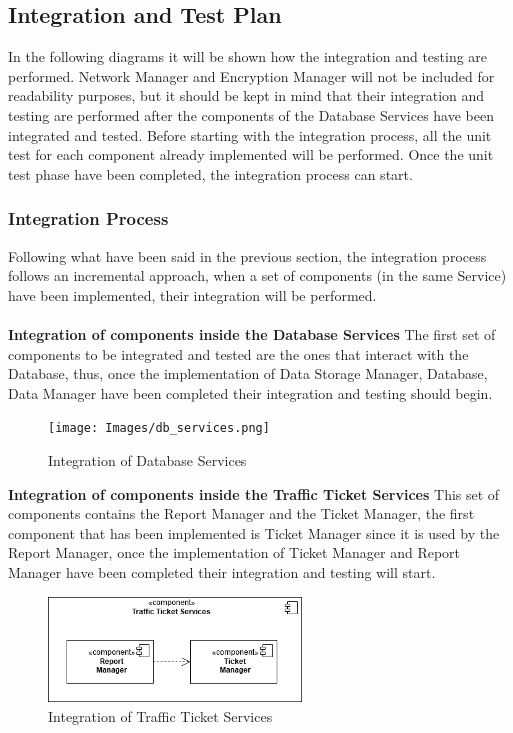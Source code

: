 \subsection{Integration and Test Plan}
In the following diagrams it will be shown how the integration and testing are performed. Network Manager and Encryption Manager will not be included for readability purposes, but it should be kept in mind that their integration and testing are performed after the components of the Database Services have been integrated and tested. Before starting with the integration process, all the unit test for each component already implemented will be performed. Once the unit test phase have been completed, the integration process can start.
\subsubsection{Integration Process}
Following what have been said in the previous section, the integration process follows an incremental approach, when a set of components (in the same Service) have been implemented, their integration will be performed.\\\\
\textbf{Integration of components inside the Database Services }\newline
The first set of components to be integrated and tested are the ones that interact with the Database, thus, once the implementation of Data Storage Manager, Database, Data Manager have been completed their integration and testing should begin.
     \begin{figure}[H]
     \centering
          \texttt{[image: Images/db\_services.png]}
        \caption{Integration of Database Services}
    \end{figure}
\noindent\textbf{Integration of components inside the Traffic Ticket Services }\newline
This set of components contains the Report Manager and the Ticket Manager, the first component that has been implemented is Ticket Manager since it is used by the Report Manager, once the implementation of Ticket Manager and Report Manager have been completed their integration and testing will start.
     \begin{figure}[H]
         \centering
          \includegraphics[width=0.6\textwidth]{Images/tt_services.png}
        \caption{Integration of Traffic Ticket Services}
    \end{figure}
